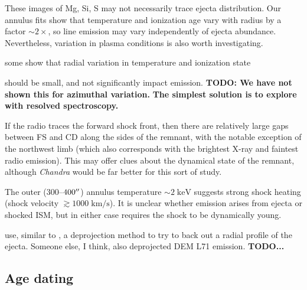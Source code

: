 \documentclass[preprint2,tighten,trackchanges]{aastex6}
\newcommand*{\mt}{\mathrm}
\newcommand*{\unit}[1]{\;\mt{#1}}  %
\newcommand*{\abt}{\mathord{\sim}} %
\begin{document}
These images of Mg, Si, S may not necessarily trace ejecta distribution.
Our annulus fits show that temperature and ionization age vary with radius by a
factor $\abt 2 \times$, so line emission may vary independently of ejecta
abundance.
Nevertheless, variation in plasma conditions is also worth investigating.

some show that radial variation in temperature and ionization state

should be small, and not significantly impact emission.
\textbf{TODO: We have not shown this for azimuthal variation.}
\textbf{The simplest solution is to explore with resolved spectroscopy.}

\begin{figure*}[!ht]
    \label{fig:rgb}
\end{figure*}

If the radio traces the forward shock front, then there are relatively
large gaps between FS and CD along the sides of the remnant, with the
notable exception of the northwest limb (which also corresponds with
the brightest X-ray and faintest radio emission).
This may offer clues about the dynamical state of the remnant, although
\textit{Chandra} would be far better for this sort of study.

The outer ($300$--$400\mbox{$^{\prime\prime}$}$) annulus temperature $\abt 2 \unit{keV}$
suggests strong shock heating (shock velocity $\gtrsim 1000 \unit{km/s}$).
It is unclear whether emission arises from ejecta or shocked ISM, but in either
case requires the shock to be dynamically young.

\citet{katsuda2015} use, similar to \citet{kosenko2010}, a deprojection method
to try to back out a radial profile of the ejecta.
Someone else, \citet{hughes2003} I think, also deprojected DEM L71 emission.
\textbf{TODO...}

\subsection{Age dating}
\end{document}
